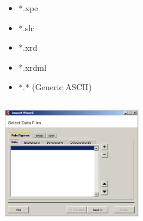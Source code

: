 \begin{frame}[fragile]
\begin{columns}
	\begin{column}{4cm}
      \begin{itemize}
  \item 	*.xpe
  \item 	*.slc 	
  \item 	*.xrd
  \item 	*.xrdml 
  \item   *.* (Generic ASCII)
		   \end{itemize}
    \end{column}
	



%
%

  \end{columns}


  \centerline{\includegraphics[width=6cm]{pic/iw}}
\end{frame}

